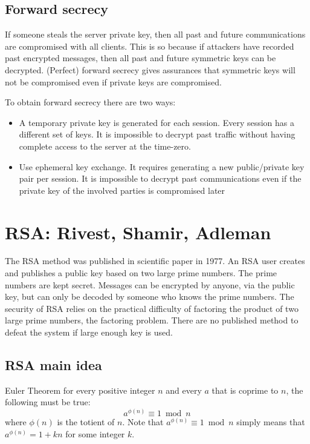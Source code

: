 \subsection{Forward secrecy}

If someone steals the server private key, then all past and future communications are compromised with all clients. This is so because if attackers have recorded past encrypted messages, then all past and future symmetric keys can be decrypted. (Perfect) forward secrecy gives assurances that symmetric keys will not be compromised even if private keys are compromised.  

To obtain forward secrecy there are two ways:
\begin{itemize}
	\item A temporary private key is generated for each session. Every session has a different set of keys. It is impossible to decrypt past traffic without having complete access to the server at the time-zero.
	\item Use ephemeral key exchange. It requires generating a new public/private key pair per session. It is impossible to decrypt past communications even if the private key of the involved parties is compromised later
\end{itemize}

\section{RSA: Rivest, Shamir, Adleman}

The RSA method was published in scientific paper in 1977. An RSA user creates and publishes a public key based on two large prime numbers. The prime numbers are kept secret. Messages can be encrypted by anyone, via the public key, but can only be decoded by someone who knows the prime numbers. The security of RSA relies on the practical difficulty of factoring the product of two large prime numbers, the factoring problem. There are no published method to defeat the system if large enough key is used.

\subsection{RSA main idea}

Euler Theorem for every positive integer $n$ and every $a$ that is coprime to $n$, the following must be true: \[a^{\phi(n)} \equiv 1 \bmod n\] where $\phi(n)$ is the totient of $n$. Note that $a^{\phi(n)} \equiv 1 \bmod n$ simply means that $a^{\phi(n)} = 1 + kn$ for some integer $k$. 

